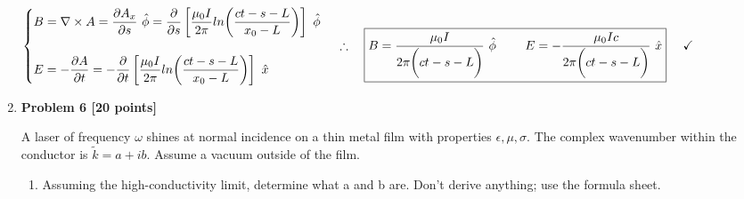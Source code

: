 \documentclass[fleqn]{article}
\begin{document}
\begin{enumerate}
{        $
          \begin{cases}
            B=\nabla \times A=\dfrac{\partial A_x}{\partial s} ~ \hat{\phi}=\dfrac{\partial}{\partial s} \left[\dfrac{\mu_0 I}{2 \pi} ln \bigg( \dfrac{ct-s-L}{x_0-L} \bigg) \right] ~ \hat{\phi}
            \\
            \\
            E=-\dfrac{\partial A}{\partial t}
            =-\dfrac{\partial}{\partial t} \left[\dfrac{\mu_0 I}{2 \pi} ln \bigg( \dfrac{ct-s-L}{x_0-L} \bigg)\right] ~ \hat{x}
          \end{cases}
          \\
          \\
          \\
          \\
          \therefore ~~~ \boxed{
            B=\dfrac{\mu_0 I}{2 \pi \bigg( ct-s-L \bigg)} ~ \hat{\phi}
            ~~~~~~~
            E=-\dfrac{\mu_0 I c}{2\pi \bigg( ct-s-L \bigg)} ~ \hat{x}
          } ~~~~ \checkmark
          \\
          \\
        $
      }

  \item \textbf{Problem 6 [20 points]}

  A laser of frequency $\omega$ shines at normal incidence on a thin metal film with properties $\epsilon, \mu, \sigma$. 
  The complex wavenumber within the conductor is $\tilde{k}= a + ib$. Assume a vacuum outside of the film.
    \begin{enumerate}
      \item Assuming the high-conductivity limit, determine what a and b are. Don't derive anything; use
      the formula sheet.


\end{enumerate}
\end{enumerate}
\end{document}

